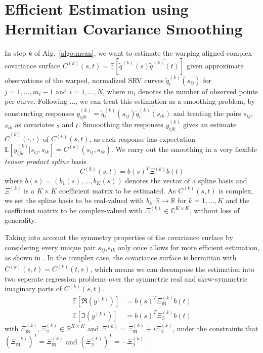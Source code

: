 \section{Efficient Estimation using Hermitian Covariance Smoothing}
\label{sec:3-cov}

In step $k$ of Alg.\ \ref{algo:mean}, we want to estimate the warping aligned complex covariance surface $C^{(k)}(s,t) = \mathbb{E}[\widetilde q^{(k)}(s)\overline{\widetilde q^{(k)}(t)}]$ given approximate observations of the warped, normalized SRV curves $\widetilde q^{(k)}_i(s_{ij})$ for $j = 1,\dots,m_i-1$ and $i=1,\dots,N$, where $m_i$ denotes the number of observed points per curve.
Following ..., we can treat this estimation as a smoothing problem, by constructing responses  $y^{(k)}_{ijk} = \widetilde q^{(k)}_i(s_{ij}) \overline{\widetilde q^{(k)}_i(s_{ik})}$ and treating the pairs $s_{ij}$, $s_{ik}$ as covariates $s$ and $t$.
Smooothing the responses $y^{(k)}_{ijk}$ gives an estimate $\hat C^{(k)}(\cdot, \cdot)$ of $C^{(k)}(s,t)$, as each response has expectation $\mathbb{E}[y^{(k)}_{ijk}|s_{ij},s_{ik}] = C^{(k)}(s_{ij},s_{ik})$. 
We carry out the smoothing in a very flexible \emph{tensor product spline} basis 
\begin{equation}
  C^{(k)}(s,t) = b(s)^T \Xi^{(k)} b(t) 
\end{equation}
where $b(s) = (b_1(s),\dots,b_K(s))$ denotes the vector of a spline basis and $\Xi^{(k)}$ is a $K \times K$ coefficient matrix to be estimated.
As $C^{(k)}(s,t)$ is complex, we set the spline basis to be real-valued with $b_k : \mathbb{R} \rightarrow \mathbb{R}$ for $k = 1,\dots,K$ and the coefficient matrix to be complex-valued with $\Xi^{(k)} \in \mathbb{C}^{K \times K}$, without loss of generality.


Taking into account the symmetry properties of the covariance surface by considering every unique pair $s_{ij}$,$s_{ik}$ only once allows for more efficient estimation, as shown in \cite{CederbaumScheiplGreven2018}. 
In the complex case, the covariance surface is hermitian with $C^{(k)}(s,t) = \overline{C^{(k)}(t,s)}$, which means we can decompose the estimation into two seperate regression problems over the symmetric real and skew-symmetric imaginary parts of $C^{(k)}(s,t)$.
\begin{align}
  \mathbb{E}[\Re(y^{(k)})] &= b(s)^T \Xi^{(k)}_{\Re} b(t) \\
  \mathbb{E}[\Im(y^{(k)})] &= b(s)^T \Xi^{(k)}_{\Im} b(t)
\end{align}
with $\Xi^{(k)}_\Re, \Xi^{(k)}_\Im \in \mathbb{R}^{K\times K}$ and $\Xi^{(k)} = \Xi^{(k)}_\Re + i \Xi^{(k)}_\Im$, under the constraints that $(\Xi^{(k)}_\Re)^T = \Xi^{(k)}_\Re$ and $(\Xi^{(k)}_\Im)^T = - \Xi^{(k)}_\Im$.

